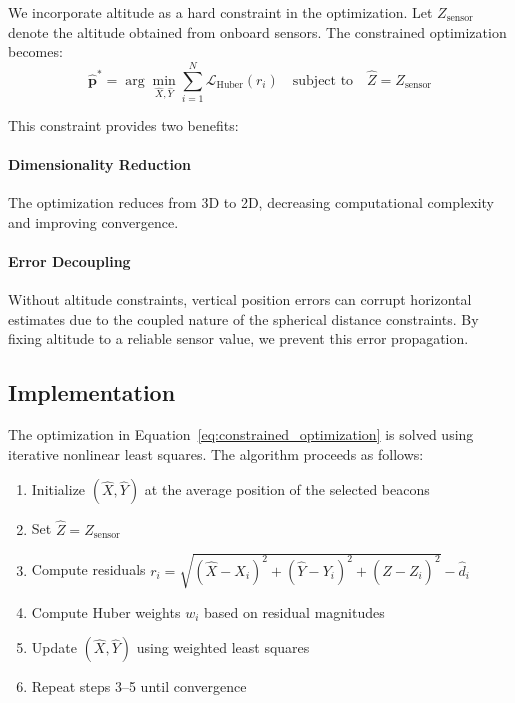 \documentclass[master,final,11pt]{iscs-thesis}
\begin{document}
We incorporate altitude as a hard constraint in the optimization.
Let $Z_{\text{sensor}}$ denote the altitude obtained from onboard sensors.
The constrained optimization becomes:
\begin{equation}
    \hat{\mathbf{p}}^* = \arg\min_{\hat{X}, \hat{Y}} \sum_{i=1}^{N} \mathcal{L}_{\text{Huber}}(r_i) \quad \text{subject to} \quad \hat{Z} = Z_{\text{sensor}}
    \label{eq:constrained_optimization}
\end{equation}

This constraint provides two benefits:

\paragraph{Dimensionality Reduction}
The optimization reduces from 3D to 2D, decreasing computational complexity and improving convergence.

\paragraph{Error Decoupling}
Without altitude constraints, vertical position errors can corrupt horizontal estimates due to the coupled nature of the spherical distance constraints.
By fixing altitude to a reliable sensor value, we prevent this error propagation.

\subsection{Implementation}

The optimization in Equation~\ref{eq:constrained_optimization} is solved using iterative nonlinear least squares.
The algorithm proceeds as follows:

\begin{enumerate}
    \item Initialize $(\hat{X}, \hat{Y})$ at the average position of the selected beacons
    \item Set $\hat{Z} = Z_{\text{sensor}}$
    \item Compute residuals $r_i = \sqrt{(\hat{X}-X_i)^2 + (\hat{Y}-Y_i)^2 + (\hat{Z}-Z_i)^2} - \hat{d}_i$
    \item Compute Huber weights $w_i$ based on residual magnitudes
    \item Update $(\hat{X}, \hat{Y})$ using weighted least squares
    \item Repeat steps 3--5 until convergence
\end{enumerate}
\end{document}
